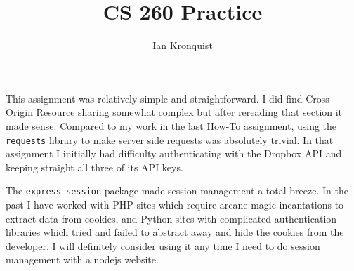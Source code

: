 \documentclass[12pt]{article}
\title{CS 260 Practice}
\author{Ian Kronquist}
\begin{document}
\maketitle

This assignment was relatively simple and straightforward. I did find Cross Origin Resource sharing somewhat complex but after rereading that section it made sense. Compared to my work in the last How-To assignment, using the \texttt{requests} library to make server side requests was absolutely trivial. In that assignment I initially had difficulty authenticating with the Dropbox API and keeping straight all three of its API keys.

The \texttt{express-session} package made session management a total breeze. In the past I have worked with PHP sites which require arcane magic incantations to extract data from cookies, and Python sites with complicated authentication libraries which tried and failed to abstract away and hide the cookies from the developer. I will definitely consider using it any time I need to do session management with a nodejs website.
\end{document}

